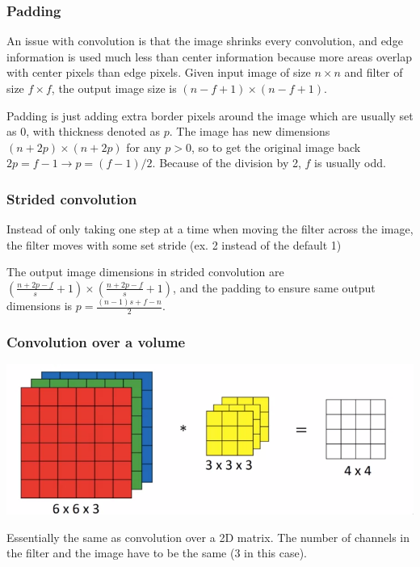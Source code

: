 \documentclass[12pt]{article}
\begin{document}
\subsubsection{Padding}

An issue with convolution is that the image shrinks every convolution, and edge information
is used much less than center information because more areas overlap with center
pixels than edge pixels. Given input image of size $n \times n$ and filter of size $f
\times f$, the output image size is $(n-f+1) \times (n-f+1)$.

Padding is just adding extra border pixels around the image which are usually
set as 0, with thickness denoted as $p$. The image has new dimensions $(n + 2p) \times
(n + 2p)$ for any $p > 0$, so to get the original image back $2p = f - 1 \rightarrow p = (f-1)/2$.
Because of the division by 2, $f$ is usually odd.

\subsubsection{Strided convolution}

Instead of only taking one step at a time when moving the filter across the image, the filter
moves with some set stride (ex. 2 instead of the default 1)

The output image dimensions in strided convolution are
$(\frac{n+2p-f}{s}+1) \times (\frac{n+2p-f}{s}+1)$, and the padding to ensure
same output dimensions is $p = \frac{(n-1)s+f-n}{2}$.

\subsubsection{Convolution over a volume}

\includegraphics[scale=.5]{images/cnn-filter-volume.png}

Essentially the same as convolution over a 2D matrix. The number of channels
in the filter and the image have to be the same (3 in this case).
\end{document}
